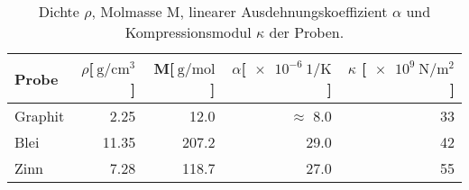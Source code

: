 
\begin{table}[!h]
\begin{center}
\begin{tabular}{|l|r|r|r|r|}
\hline
Probe & $\rho$[$\SI{}{\gram\per\centi\meter^3}$] & M[$\SI{}{\gram\per\mol}$] & $\alpha$[$\SI{e-6}{1\per\kelvin}$] & $\kappa$ [$\SI{e9}{\newton\per\meter^2}$]\\
\hline
\hline
Graphit	& 2.25  & 12.0  & $\approx$ 8.0  & 33\\
Blei	& 11.35 & 207.2 & 29.0 & 42\\
Zinn	& 7.28  & 118.7 & 27.0 & 55\\
\hline
\end{tabular}
\caption[]{Dichte $\rho$, Molmasse M, linearer Ausdehnungskoeffizient $\alpha$ und Kompressionsmodul $\kappa$ der Proben.}
\label{massen}
\end{center}
\end{table}